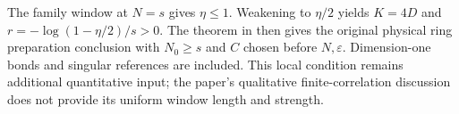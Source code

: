 \documentclass{article}
\begin{document}
The family window at $N=s$ gives $\eta\le1$. Weakening to $\eta/2$ yields
$K=4D$ and $r=-\log(1-\eta/2)/s>0$. The theorem
in 
then gives the original physical ring preparation conclusion with $N_0\ge s$
and $C$ chosen before $N,\varepsilon$. Dimension-one bonds and singular references
are included. This local condition remains additional quantitative input;
the paper's qualitative finite-correlation discussion does not provide its uniform
window length and strength.


\end{document}
